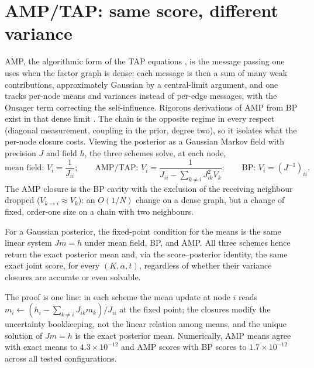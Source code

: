 \section{AMP/TAP: same score, different variance}\label{sec:bp-amp}

AMP, the algorithmic form of the TAP equations
\citep{thouless1977solution, donoho2009message, zdeborova2016statistical},
is the message passing one uses when the factor graph is dense: each
message is then a sum of many weak contributions, approximately Gaussian
by a central-limit argument, and one tracks per-node means and variances
instead of per-edge messages, with the Onsager term correcting the
self-influence. Rigorous derivations of AMP from BP exist in that dense
limit \citep{genovese2026amp}. The chain is the opposite regime in every
respect (diagonal measurement, coupling in the prior, degree two), so it
isolates what the per-node closure costs. Viewing the posterior as a
Gaussian Markov field with precision $J$ and field $h$, the three schemes
solve, at each node,
\begin{equation}
  \text{mean field: } V_i = \frac{1}{J_{ii}};
  \qquad
  \text{AMP/TAP: } V_i = \frac{1}{J_{ii} - \sum_{k \neq i} J_{ik}^2 V_k};
  \qquad
  \text{BP: } V_i = (J^{-1})_{ii} .
  \label{eq:bp-three-closures}
\end{equation}
The AMP closure is the BP cavity with the exclusion of the receiving
neighbour dropped ($V_{k \to i} \approx V_k$): an $O(1/N)$ change on a
dense graph, but a change of fixed, order-one size on a chain with
two neighbours.

\begin{theorem}\label{thm:bp-same-score}
For a Gaussian posterior, the fixed-point condition for the means is the
same linear system $J m = h$ under mean field, BP, and AMP. All three
schemes hence return the exact posterior mean and, via the
score--posterior identity, the same exact joint score, for every
$(K, \alpha, t)$, regardless of whether their variance closures are
accurate or even solvable.
\end{theorem}

The proof is one line: in each scheme the mean update at node $i$ reads
$m_i \leftarrow (h_i - \sum_{k \neq i} J_{ik} m_k)/J_{ii}$ at the fixed
point; the closures modify the uncertainty bookkeeping, not the linear
relation among means, and the unique solution of $Jm = h$ is the exact
posterior mean. Numerically, AMP means agree with exact means to
$4.3 \times 10^{-12}$ and AMP scores with BP scores to
$1.7 \times 10^{-12}$ across all tested configurations.

